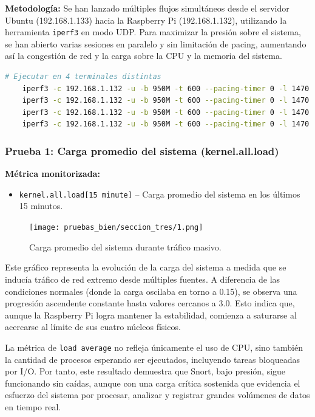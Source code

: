 \documentclass[11pt,a4paper,twoside]{report}
\begin{document}
\textbf{Metodología:}  
Se han lanzado múltiples flujos simultáneos desde el servidor Ubuntu (192.168.1.133) hacia la Raspberry Pi (192.168.1.132), utilizando la herramienta \texttt{iperf3} en modo UDP. Para maximizar la presión sobre el sistema, se han abierto varias sesiones en paralelo y sin limitación de pacing, aumentando así la congestión de red y la carga sobre la CPU y la memoria del sistema.

\newpage

\begin{lstlisting}[language=bash,caption={Simulación de tráfico masivo desde Ubuntu Server hacia la Raspberry Pi},label={lst:trafico-masivo}]
	# Ejecutar en 4 terminales distintas
	iperf3 -c 192.168.1.132 -u -b 950M -t 600 --pacing-timer 0 -l 1470 -p 5201
	iperf3 -c 192.168.1.132 -u -b 950M -t 600 --pacing-timer 0 -l 1470 -p 5202
	iperf3 -c 192.168.1.132 -u -b 950M -t 600 --pacing-timer 0 -l 1470 -p 5203
	iperf3 -c 192.168.1.132 -u -b 950M -t 600 --pacing-timer 0 -l 1470 -p 5204
\end{lstlisting}

\subsubsection*{Prueba 1: Carga promedio del sistema (kernel.all.load)}

\textbf{Métrica monitorizada:}
\begin{itemize}
	\item \texttt{kernel.all.load[15 minute]} – Carga promedio del sistema en los últimos 15 minutos.
\end{itemize}

\begin{figure}[H]
	\centering
	\texttt{[image: pruebas\_bien/seccion\_tres/1.png]}
	\caption{Carga promedio del sistema durante tráfico masivo.}
\end{figure}

Este gráfico representa la evolución de la carga del sistema a medida que se inducía tráfico de red extremo desde múltiples fuentes. A diferencia de las condiciones normales (donde la carga oscilaba en torno a 0.15), se observa una progresión ascendente constante hasta valores cercanos a 3.0. Esto indica que, aunque la Raspberry Pi logra mantener la estabilidad, comienza a saturarse al acercarse al límite de sus cuatro núcleos físicos.\newline

La métrica de \texttt{load average} no refleja únicamente el uso de CPU, sino también la cantidad de procesos esperando ser ejecutados, incluyendo tareas bloqueadas por I/O. Por tanto, este resultado demuestra que Snort, bajo presión, sigue funcionando sin caídas, aunque con una carga crítica sostenida que evidencia el esfuerzo del sistema por procesar, analizar y registrar grandes volúmenes de datos en tiempo real.
\end{document}

